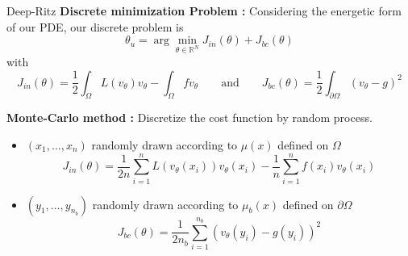 \begin{frame}{Deep-Ritz}
	\textbf{Discrete minimization Problem :} Considering the energetic form of our PDE, our discrete problem is
	\begin{equation}
		\theta_u=\arg\min_{\theta\in\mathbb{R}^N} J_{in}(\theta)+J_{bc}(\theta) \label{minpb_deepritz}
	\end{equation}
	with 
	\begin{equation*}
		J_{in}(\theta)=\frac{1}{2}\int_\Omega L(v_\theta)v_\theta - \int_\Omega fv_\theta  \qquad \text{and} \qquad J_{bc}(\theta)=\frac{1}{2}\int_{\partial\Omega} (v_\theta-g)^2
	\end{equation*}	
	
	\textbf{Monte-Carlo method :} Discretize the cost function by random process.
	
	\begin{itemize}[\textbullet]
		\item $(x_1,\dots,x_n)$ randomly drawn according to $\mu(x)$ defined on $\Omega$ 
		\begin{equation*}
			J_{in}(\theta)=\frac{1}{2n}\sum_{i=1}^n L(v_\theta(x_i))v_\theta(x_i) - \frac{1}{n}\sum_{i=1}^n f(x_i)v_\theta(x_i)
		\end{equation*}
		\item $(y_1,\dots,y_{n_b})$ randomly drawn according to $\mu_b(x)$ defined on $\partial\Omega$
		\begin{equation*}
			J_{bc}(\theta)=\frac{1}{2n_b}\sum_{i=1}^{n_b} (v_\theta(y_i)-g(y_i))^2
		\end{equation*}
	\end{itemize}	
\end{frame}

